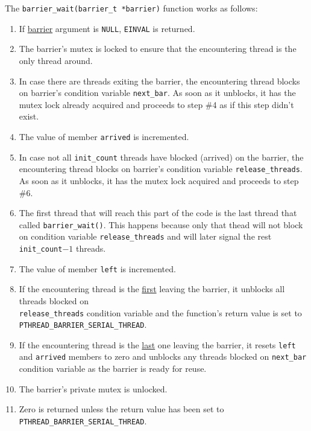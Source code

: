 \documentclass{article}
\def\code#1{\texttt{#1}}
\begin{document}
\hspace{-0.6cm} The \code{barrier\_wait(barrier\_t *barrier)} function works as follows:
\begin{enumerate}
 \item If \underline{barrier} argument is \code{NULL}, \code{EINVAL} is returned.
 \item The barrier's mutex is locked to ensure that the encountering thread is the only thread around.
 \item In case there are threads exiting the barrier, the encountering thread blocks on barrier's
       condition variable \code{next\_bar}. As soon as it unblocks, it has the mutex lock already
       acquired and proceeds to step \#4 as if this step didn't exist.
 \item The value of member \code{arrived} is incremented.
 \item In case not all \code{init\_count} threads have blocked (arrived) on the barrier, the
       encountering thread blocks on barrier's condition variable \code{release\_threads}.
       As soon as it unblocks, it has the mutex lock acquired and proceeds to step \#6.
 \item The first thread that will reach this part of the code is the last thread that
       called \code{barrier\_wait()}. This happens because only that thead will not block
       on condition variable \code{release\_threads} and will later signal the rest
       \code{init\_count}$-1$ threads.
 \item The value of member \code{left} is incremented.
 \item If the encountering thread is the \underline{first} leaving the barrier, it unblocks all
       threads blocked on \\ \code{release\_threads} condition variable and the function's
       return value is set to\\ \code{PTHREAD\_BARRIER\_SERIAL\_THREAD}.
 \item If the encountering thread is the \underline{last} one leaving the barrier, it resets
       \code{left} and \code{arrived} members to zero and unblocks any threads blocked on
       \code{next\_bar} condition variable as the barrier is ready for reuse.
 \item The barrier's private mutex is unlocked.
 \item Zero is returned unless the return value has been set to \code{PTHREAD\_BARRIER\_SERIAL\_THREAD}.
\end{enumerate}
\end{document}
